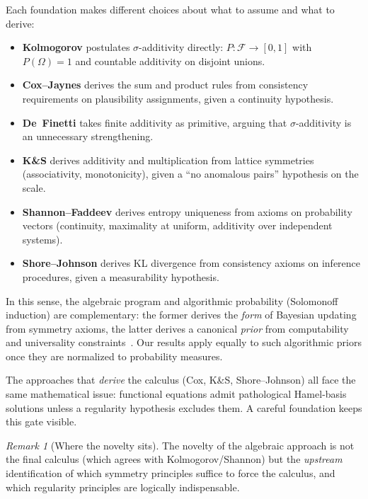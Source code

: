 \documentclass[11pt]{article}
\theoremstyle{definition}
\theoremstyle{remark}
\newtheorem{remark}[theorem]{Remark}
\begin{document}
Each foundation makes different choices about what to assume and what to derive:

\begin{itemize}
\item \textbf{Kolmogorov} postulates $\sigma$-additivity directly: $P:\mathcal{F}\to[0,1]$
  with $P(\Omega)=1$ and countable additivity on disjoint unions. \cite{Kolmogorov1933}

\item \textbf{Cox--Jaynes} derives the sum and product rules from consistency requirements on
  plausibility assignments, given a continuity hypothesis. \cite{Cox1946}

\item \textbf{De~Finetti} takes finite additivity as primitive, arguing that $\sigma$-additivity
  is an unnecessary strengthening. \cite{deFinetti1974}

\item \textbf{K\&S} derives additivity and multiplication from lattice symmetries (associativity,
  monotonicity), given a ``no anomalous pairs'' hypothesis on the scale.

\item \textbf{Shannon--Faddeev} derives entropy uniqueness from axioms on probability vectors
  (continuity, maximality at uniform, additivity over independent systems).
  \cite{Shannon1948,Faddeev1956}

\item \textbf{Shore--Johnson} derives KL divergence from consistency axioms on inference
  procedures, given a measurability hypothesis. \cite{ShoreJohnson1980}
\end{itemize}

In this sense, the algebraic program and algorithmic probability (Solomonoff induction) are complementary:
the former derives the \emph{form} of Bayesian updating from symmetry axioms, the latter derives a
canonical \emph{prior} from computability and universality constraints~\cite{Solomonoff1964,Hutter2005}.
Our results apply equally to such algorithmic priors once they are normalized to probability measures.

The approaches that \emph{derive} the calculus (Cox, K\&S, Shore--Johnson) all face the same
mathematical issue: functional equations admit pathological Hamel-basis solutions unless a
regularity hypothesis excludes them.  A careful foundation keeps this gate visible.

\begin{remark}[Where the novelty sits]
The novelty of the algebraic approach is not the final calculus (which agrees with
Kolmogorov/Shannon) but the \emph{upstream} identification of which symmetry principles
suffice to force the calculus, and which regularity principles are logically indispensable.
\end{remark}
\end{document}
